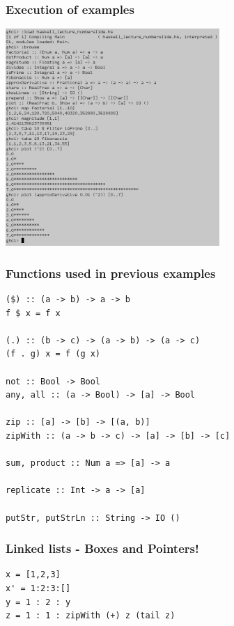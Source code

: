 \documentclass{beamer}
\begin{document}
\begin{frame}[fragile]
\frametitle{Execution of examples}
\includegraphics[width=\textwidth, height=3.25in]{haskell_lecture_numberslide_ghci1_cropped.png}
\end{frame}

\begin{frame}[fragile]
\frametitle{Functions used in previous examples}
\begin{Verbatim}[frame=single, fontsize=\scriptsize]
($) :: (a -> b) -> a -> b
f $ x = f x

(.) :: (b -> c) -> (a -> b) -> (a -> c)
(f . g) x = f (g x)

not :: Bool -> Bool
any, all :: (a -> Bool) -> [a] -> Bool

zip :: [a] -> [b] -> [(a, b)]
zipWith :: (a -> b -> c) -> [a] -> [b] -> [c]

sum, product :: Num a => [a] -> a

replicate :: Int -> a -> [a]

putStr, putStrLn :: String -> IO ()
\end{Verbatim}
\end{frame}

\begin{frame}[fragile]
\frametitle{Linked lists - Boxes and Pointers!}
\begin{Verbatim}[frame=single, fontsize=\scriptsize]
x = [1,2,3]
x' = 1:2:3:[]
y = 1 : 2 : y
z = 1 : 1 : zipWith (+) z (tail z)
\end{Verbatim}
\end{frame}
\end{document}
